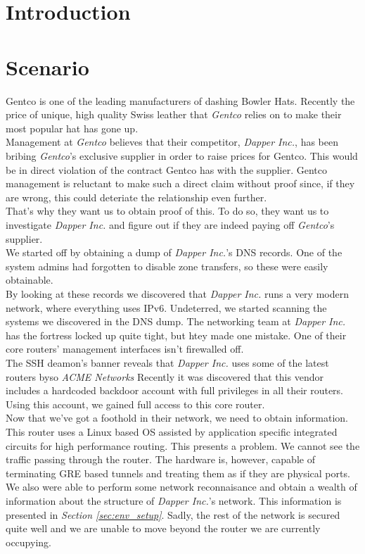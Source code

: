 \documentclass[11pt,a4paper,oneside]{article}
\title{\ftitle\\\coursecode { -} \coursename}
\author{\fauthor}
\newcommand{\lsection}[2]{\section{#1}\label{sec:#2}}
\begin{document}
    \maketitle\thispagestyle{fancy}
    \newpage
    \tableofcontents
    \newpage


    \lsection{Introduction}{intro}


    \lsection{Scenario}{scenario}
    Gentco is one of the leading manufacturers of dashing Bowler Hats. Recently the price of unique, high quality Swiss leather that \textit{Gentco} relies on to make their most popular hat has gone up.\\
    Management at \textit{Gentco} believes that their competitor, \textit{Dapper Inc.}, has been bribing \textit{Gentco}'s exclusive supplier in order to raise prices for Gentco. This would be in direct violation of the contract Gentco has with the supplier. Gentco management is reluctant to make such a direct claim without proof since, if they are wrong, this could deteriate the relationship even further.\\
    That's why they want us to obtain proof of this. To do so, they want us to investigate \textit{Dapper Inc.} and figure out if they are indeed paying off \textit{Gentco}'s supplier.\\
    We started off by obtaining a dump of \textit{Dapper Inc.}'s DNS records. One of the system admins had forgotten to disable zone transfers, so these were easily obtainable.\\
    By looking at these records we discovered that \textit{Dapper Inc.} runs a very modern network, where everything uses IPv6. Undeterred, we started scanning the systems we discovered in the DNS dump. The networking team at \textit{Dapper Inc.} has the fortress locked up quite tight, but htey made one mistake. One of their core routers' management interfaces isn't firewalled off.\\
    The SSH deamon's banner reveals that \textit{Dapper Inc.} uses some of the latest routers byso \textit{ACME Networks} Recently it was discovered that this vendor includes a hardcoded backdoor account with full privileges in all their routers. Using this account, we gained full access to this core router.\\
    Now that we've got a foothold in their network, we need to obtain information. This router uses a Linux based OS assisted by application specific integrated circuits for high performance routing. This presents a problem. We cannot see the traffic passing through the router. The hardware is, however, capable of terminating GRE based tunnels and treating them as if they are physical ports. We also were able to perform some network reconnaisance and obtain a wealth of information about the structure of \textit{Dapper Inc.}'s network. This information is presented in \textit{Section \ref{sec:env_setup}}. Sadly, the rest of the network is secured quite well and we are unable to move beyond the router we are currently occupying.\\
\end{document}
